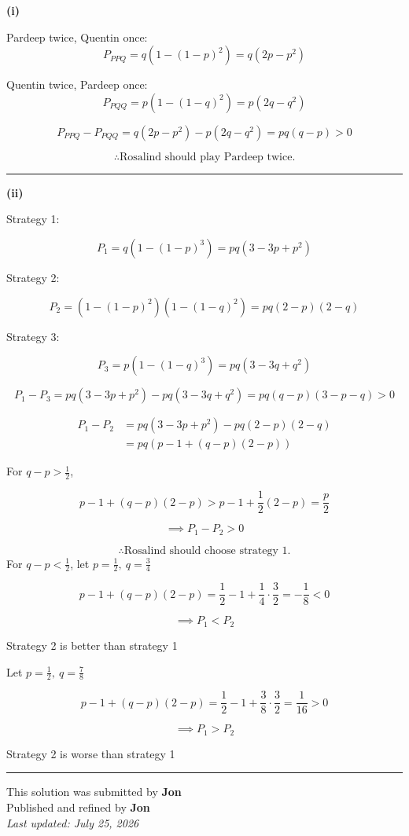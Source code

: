 \documentclass[12pt]{article}
\begin{document}
\newcommand{\ds}{\displaystyle}

\textbf{(i)}

Pardeep twice, Quentin once: 
$$P_{PPQ}=q\left(1-(1-p)^2\right)=q(2p-p^2)$$

Quentin twice, Pardeep once: 
$$P_{PQQ}=p\left(1-(1-q)^2\right)=p(2q-q^2)$$

$$P_{PPQ}-P_{PQQ}=q(2p-p^2)-p(2q-q^2)=pq(q-p)>0$$

$$\therefore \text{Rosalind should play Pardeep twice.}$$

\bigskip\hrule\bigskip

\textbf{(ii)}

Strategy 1:

$$P_1=q\left(1-(1-p)^3\right)=pq(3-3p+p^2)$$

Strategy 2:

$$P_2=\left(1-(1-p)^2\right)\left(1-(1-q)^2\right)=pq(2-p)(2-q)$$

Strategy 3:

$$P_3=p\left(1-(1-q)^3\right)=pq(3-3q+q^2)$$

$$P_1-P_3=pq(3-3p+p^2)-pq(3-3q+q^2)=pq(q-p)(3-p-q)>0$$

\begin{align*}
P_1-P_2
&=pq(3-3p+p^2)-pq(2-p)(2-q)\\
&=pq\left(p-1+(q-p)(2-p)\right)
\end{align*}

For $\ds q-p>\frac12$,

$$p-1+(q-p)(2-p)>p-1+\frac12(2-p)=\frac p2$$

$$\implies P_1-P_2>0$$

$$\therefore \text{Rosalind should choose strategy 1.}$$
For $\ds q-p<\frac12$, let $\ds p=\frac12,\  q=\frac34$

$$p-1+(q-p)(2-p)=\frac12-1+\frac14\cdot\frac32=-\frac18<0$$

$$\implies P_1<P_2$$

Strategy 2 is better than strategy 1

Let $\ds p=\frac12,\  q=\frac78$

$$p-1+(q-p)(2-p)=\frac12-1+\frac38\cdot\frac32=\frac1{16}>0$$

$$\implies P_1>P_2$$

Strategy 2 is worse than strategy 1

\bigskip
\hrule
\begin{center}
    This solution was submitted by \textbf{Jon}\\[4pt]
    Published and refined by \textbf{Jon}\\[8pt]
    \textit{Last updated: July 25, 2026}
\end{center}
\end{document}
